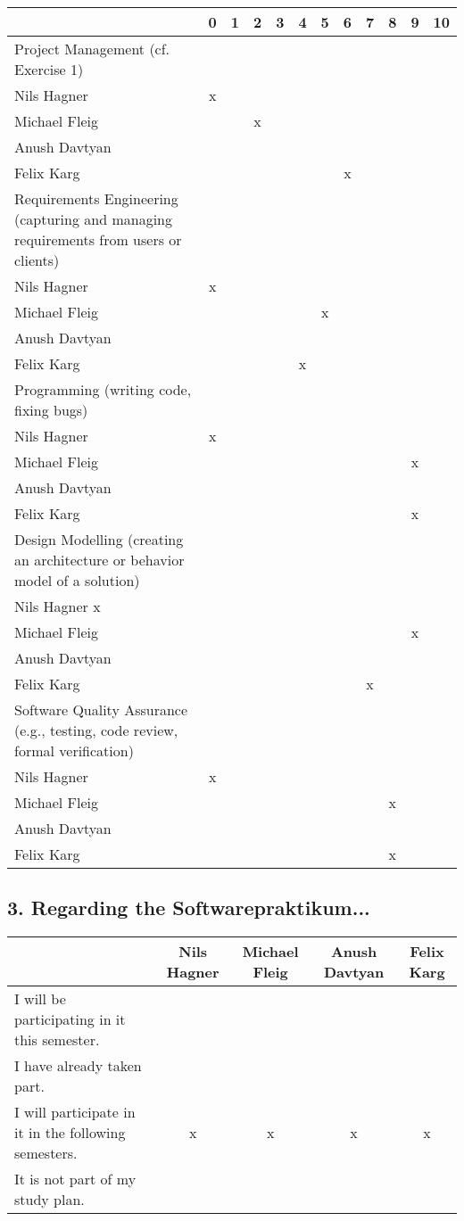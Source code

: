 \documentclass{scrartcl}
\begin{document}
\begin{tabular}{| p{10cm} | c | c | c | c | c | c | c | c | c | c | c |}
	\hline
	& 0& 1& 2& 3& 4& 5& 6& 7& 8& 9& 10\\
	\hline
	Project Management (cf. Exercise 1) \\
	\hline
	Nils Hagner &x&&&&&&&&&\\ \hline
	Michael Fleig &&&x&&&&&&&\\ \hline
	Anush Davtyan &&&&&&&&&&\\ \hline
	Felix Karg &&&&&&&x&&&\\ \hline
	Requirements Engineering (capturing and managing requirements from users or clients)\\
	\hline
	Nils Hagner &x&&&&&&&&&\\ \hline
	Michael Fleig &&&&&&x&&&&\\ \hline
	Anush Davtyan &&&&&&&&&&\\ \hline
	Felix Karg &&&&&x&&&&&\\ \hline
	Programming (writing code, fixing bugs)\\
	\hline
	Nils Hagner &x&&&&&&&&&\\ \hline
	Michael Fleig &&&&&&&&&&x&\\ \hline
	Anush Davtyan &&&&&&&&&&\\ \hline
	Felix Karg &&&&&&&&&&x\\ \hline
	Design Modelling (creating an architecture or behavior model of a solution)\\
	\hline
	Nils Hagner x&&&&&&&&&&\\ \hline
	Michael Fleig &&&&&&&&&&x\\ \hline
	Anush Davtyan &&&&&&&&&&\\ \hline
	Felix Karg &&&&&&&&x&&\\ \hline
	Software Quality Assurance (e.g., testing, code review, formal verification)\\
	\hline
	Nils Hagner &x&&&&&&&&&\\ \hline
	Michael Fleig &&&&&&&&&x&\\ \hline
	Anush Davtyan &&&&&&&&&&\\ \hline
	Felix Karg &&&&&&&&&x&\\ \hline
\end{tabular}


\subsection*{3. Regarding the Softwarepraktikum...}
\begin{tabular} {| p{8cm} | c | c | c | c |}
	\hline
	&Nils Hagner&Michael Fleig&Anush Davtyan&Felix Karg\\
	\hline
	I will be participating in it this semester. &&&&\\
	\hline
	I have already taken part. &&&&\\
	\hline
	I will participate in it in the following semesters. &x&x&x&x\\
	\hline
	It is not part of my study plan. &&&&\\
	\hline
\end{tabular}
\end{document}
